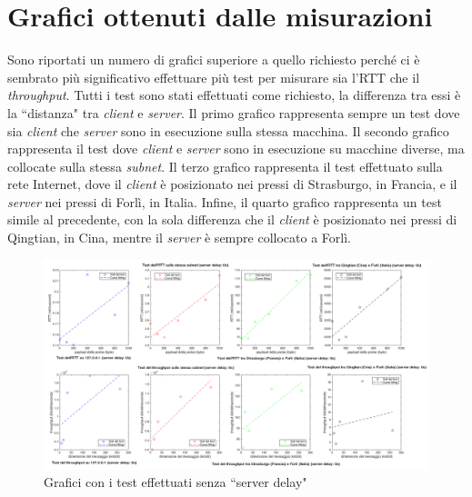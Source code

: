 \documentclass[a4paper, 12pt]{report}
\begin{document}
\section{Grafici ottenuti dalle misurazioni}

Sono riportati un numero di grafici superiore a quello richiesto perché ci è sembrato più significativo effettuare più test per misurare sia l'RTT
che il \textit{throughput}. Tutti i test sono stati effettuati come richiesto, la differenza tra essi è la ``distanza" tra \textit{client} e
\textit{server}. Il primo grafico rappresenta sempre un test dove sia \textit{client} che \textit{server} sono in esecuzione sulla stessa macchina.
Il secondo grafico rappresenta il test dove \textit{client} e \textit{server} sono in esecuzione su macchine diverse, ma collocate sulla stessa
\textit{subnet}. Il terzo grafico rappresenta il test effettuato sulla rete Internet, dove il \textit{client} è posizionato nei pressi di Strasburgo,
in Francia, e il \textit{server} nei pressi di Forlì, in Italia. Infine, il quarto grafico rappresenta un test simile al precedente, con la sola
differenza che il \textit{client} è posizionato nei pressi di Qingtian, in Cina, mentre il \textit{server} è sempre collocato a Forlì.

\begin{figure}[H]
	\centering
	\includegraphics[width=\linewidth]{images/nodelay.png}
	\caption{Grafici con i test effettuati senza ``server delay"}
\end{figure}
\end{document}
